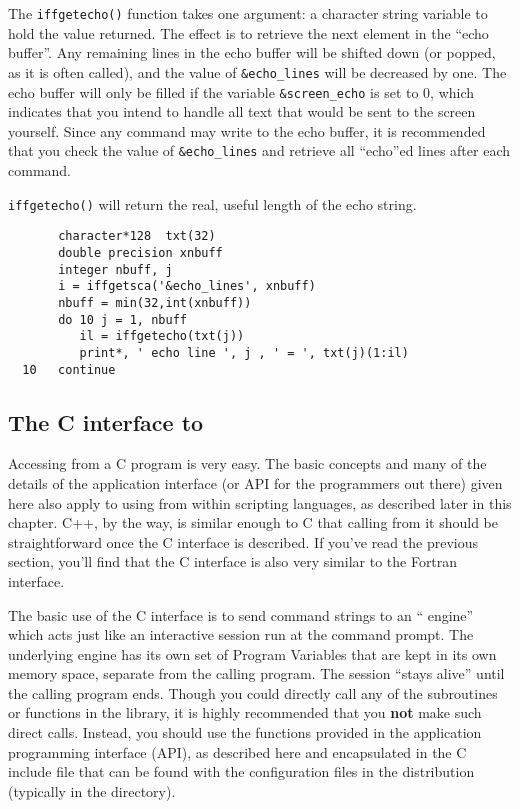 {} The {\tt{iffgetecho()}} function
takes one argument: a character string variable to hold the value returned.
The effect is to retrieve the next element in the ``echo buffer''.  Any
remaining lines in the echo buffer will be shifted down (or popped, as it
is often called), and the value of {\tt{\&echo\_lines}} will be decreased
by one.  The echo buffer will only be filled if the variable
{\tt{\&screen\_echo}} is set to 0, which indicates that you intend to
handle all text that would be sent to the screen yourself.  Since any
command may write to the echo buffer, it is recommended that you check the
value of {\tt{\&echo\_lines}} and retrieve all ``echo''ed lines after each
command.  

{\tt{iffgetecho()}} will return the real, useful length of the echo string.

\begin{verbatim}
       character*128  txt(32)
       double precision xnbuff
       integer nbuff, j
       i = iffgetsca('&echo_lines', xnbuff)
       nbuff = min(32,int(xnbuff))
       do 10 j = 1, nbuff
          il = iffgetecho(txt(j)) 
          print*, ' echo line ', j , ' = ', txt(j)(1:il)
  10   continue
\end{verbatim} %
\noindent

\subsection{The C interface to {\ifeffit}}\label{Ch:Scripting-cc}

{}
Accessing {\ifeffit} from a C program is very easy.  The basic concepts and
many of the details of the {\ifeffit} application interface (or API for the
programmers out there) given here also apply to using {\ifeffit} from
within scripting languages, as described later in this chapter.  C++, by
the way, is similar enough to C that calling {\ifeffit} from it should be
straightforward once the C interface is described.  If you've read the
previous section, you'll find that the C interface is also very similar to
the Fortran interface.

The basic use of the {\ifeffit} C interface is to send command strings to
an ``{\ifeffit} engine'' which acts just like an interactive {\ifeffit}
session run at the command prompt.  The underlying engine has its own set
of Program Variables that are kept in its own memory space, separate from
the calling program.  The session ``stays alive'' until the calling program
ends.  Though you could directly call any of the subroutines or functions
in the {\ifeffit} library, it is highly recommended that you {\bf{not}}
make such direct calls.  Instead, you should use the functions provided in
the application programming interface (API), as described here and
encapsulated in the C include file {} that can be found
with the configuration files in the {\ifeffit} distribution (typically in
the {} directory).
{}

